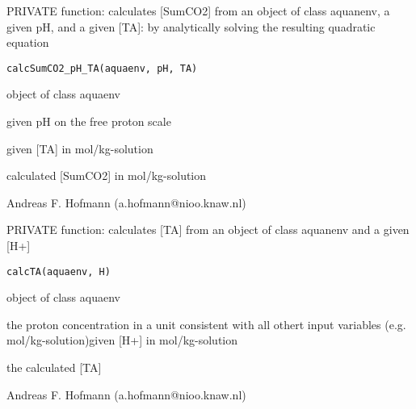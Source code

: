 \documentclass{article}
\begin{document}
\begin{Description}\relax
PRIVATE function: calculates [SumCO2]  from an object of class aquanenv, a given pH, and a given [TA]: by analytically solving the resulting quadratic equation
\end{Description}
\begin{Usage}
\begin{verbatim}calcSumCO2_pH_TA(aquaenv, pH, TA)\end{verbatim}
\end{Usage}
\begin{Arguments}
\begin{ldescription}
\item[\code{aquaenv }] object of class aquaenv
\item[\code{pH }] given pH on the free proton scale
\item[\code{TA }] given [TA] in mol/kg-solution
\end{ldescription}
\end{Arguments}
\begin{Value}
calculated [SumCO2] in mol/kg-solution
\end{Value}
\begin{Author}\relax
Andreas F. Hofmann (a.hofmann@nioo.knaw.nl)
\end{Author}

\begin{Description}\relax
PRIVATE function: calculates [TA] from an object of class aquanenv and a given [H+]
\end{Description}
\begin{Usage}
\begin{verbatim}calcTA(aquaenv, H)\end{verbatim}
\end{Usage}
\begin{Arguments}
\begin{ldescription}
\item[\code{aquaenv }] object of class aquaenv
\item[\code{H }] the proton concentration in a unit consistent with all othert input variables (e.g. mol/kg-solution)given [H+] in mol/kg-solution
\end{ldescription}
\end{Arguments}
\begin{Value}
the calculated [TA]
\end{Value}
\begin{Author}\relax
Andreas F. Hofmann (a.hofmann@nioo.knaw.nl)
\end{Author}
\end{document}
